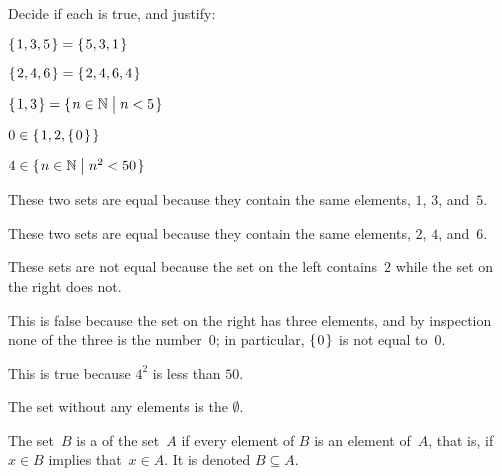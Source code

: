 \documentclass{ibl}  %
\begin{document}
\begin{ex} Decide if each is true, and justify:
\begin{items}
\item $\mbox{$\{\hspace{0.1em}1,3,5\hspace{0.1em}\}$}=\mbox{$\{\hspace{0.1em}5,3,1\hspace{0.1em}\}$}$    
\item $\mbox{$\{\hspace{0.1em}2, 4, 6\hspace{0.1em}\}$}=\mbox{$\{\hspace{0.1em}2, 4, 6, 4\hspace{0.1em}\}$}$    
\item $\mbox{$\{\hspace{0.1em}1, 3\hspace{0.1em}\}$}=\mbox{$\{\hspace{0.1em}n\in\mathbb{N}\bigm| n<5\hspace{0.1em}\}$}$ 
\item $0\in\mbox{$\{\hspace{0.1em}1,2,\mbox{$\{\hspace{0.1em}0\hspace{0.1em}\}$}\hspace{0.1em}\}$}$   
\item $4\in\mbox{$\{\hspace{0.1em}n\in\mathbb{N}\bigm| n^2<50\hspace{0.1em}\}$}$
\end{items}
\begin{ans}
\begin{items}
\item These two sets are equal because they contain the same elements, 
  $1$, $3$, and~$5$.
\item These two sets are equal because they contain the same elements, 
  $2$, $4$, and~$6$.
\item These sets are not equal because the set on the left contains~$2$
  while the set on the right does not.
\item This is false because the set on the right has three elements, 
  and by inspection none of the three is the number~$0$;
  in particular, $\mbox{$\{\hspace{0.1em}0\hspace{0.1em}\}$}$ is not equal to~$0$.
\item This is true because $4^2$ is less than $50$.    
\end{items}
\end{ans}
\end{ex}

\begin{df}
The set without any elements is the  $\emptyset$.  
\end{df}

\begin{df}
The set~$B$ is a  of the set~$A$
if every element of $B$ is an element of~$A$,
that is, if $x\in B$ implies that~$x\in A$.
It is denoted $B\subseteq A$.
\end{df}
\end{document}
